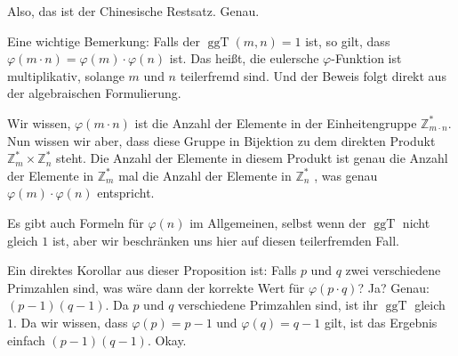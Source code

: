 \begin{spoken-clean}[01:19:22 - 01:23:02]
Also, das ist der Chinesische Restsatz. Genau.

Eine wichtige Bemerkung: Falls der $\operatorname{ggT}(m, n) = 1$ ist, so gilt, dass $\varphi(m \cdot n) = \varphi(m) \cdot \varphi(n)$ ist. Das heißt, die eulersche $\varphi$-Funktion ist multiplikativ, solange $m$ und $n$ teilerfremd sind. Und der Beweis folgt direkt aus der algebraischen Formulierung.

Wir wissen, $\varphi(m \cdot n)$ ist die Anzahl der Elemente in der Einheitengruppe $\mathbb{Z}_{m \cdot n}^*$. Nun wissen wir aber, dass diese Gruppe in Bijektion zu dem direkten Produkt $\mathbb{Z}_m^* \times \mathbb{Z}_n^*$ steht. Die Anzahl der Elemente in diesem Produkt ist genau die Anzahl der Elemente in $\mathbb{Z}_m^*$ mal die Anzahl der Elemente in $\mathbb{Z}_n^*$ , was genau $\varphi(m) \cdot \varphi(n)$ entspricht.

Es gibt auch Formeln für $\varphi(n)$ im Allgemeinen, selbst wenn der $\operatorname{ggT}$ nicht gleich $1$ ist, aber wir beschränken uns hier auf diesen teilerfremden Fall.

Ein direktes Korollar aus dieser Proposition ist: Falls $p$ und $q$ zwei verschiedene Primzahlen sind, was wäre dann der korrekte Wert für $\varphi(p \cdot q)$? Ja? Genau: $(p-1)(q-1)$. Da $p$ und $q$ verschiedene Primzahlen sind, ist ihr $\operatorname{ggT}$ gleich $1$. Da wir wissen, dass $\varphi(p) = p-1$ und $\varphi(q) = q-1$ gilt, ist das Ergebnis einfach $(p-1)(q-1)$. Okay.
\end{spoken-clean}

